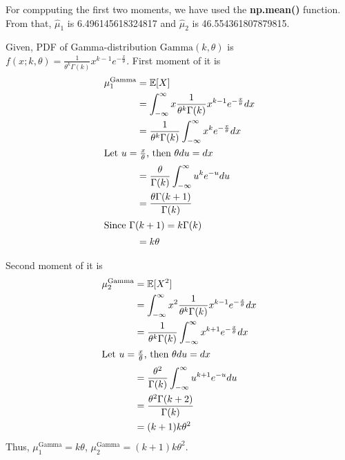 \begin{solution}
  	For compputing the first two moments, we have used the \textbf{np.mean()} function. From that, $\hat{\mu}_{1}$ is 6.496145618324817
   	and  $\hat{\mu}_{2}$ is 46.554361807879815.
    	
	Given, PDF of Gamma-distribution $\text{Gamma}(k, \theta)$ is $f(x;k,\theta) =
		\frac{1}{\theta^k\Gamma(k)}x^{k-1}e^{-\frac{x}{\theta}}$. First moment
	of it is
	\begin{align}
		\mu_1^\text{Gamma} & = \mathbb{E}[X]                               \\
		                   & = \int_{-\infty}^\infty
		x\frac{1}{\theta^k\Gamma(k)}x^{k-1}e^{-\frac{x}{\theta}}dx
		\\
		                   & =
		\frac{1}{\theta^k\Gamma(k)}\int_{-\infty}^\infty
		x^ke^{-\frac{x}{\theta}}dx                                 \\
		\intertext{Let $u = \frac{x}{\theta}$, then $\theta du = dx$}
		                   & =
		\frac{\theta}{\Gamma(k)}\int_{-\infty}^\infty
		u^k e^{-u} du                                              \\
		                   & = \frac{\theta\Gamma(k+1)}{\Gamma(k)}
		\\
		\intertext{Since $\Gamma(k+1)=k\Gamma(k)$}
		                   & = k\theta
	\end{align}

	Second moment of it is
	\begin{align}
		\mu_2^\text{Gamma} & = \mathbb{E}[X^2]                               \\
		                   & = \int_{-\infty}^\infty
		x^2\frac{1}{\theta^k\Gamma(k)}x^{k-1}e^{-\frac{x}{\theta}}dx
		\\
		                   & =
		\frac{1}{\theta^k\Gamma(k)}\int_{-\infty}^\infty
		x^{k+1}e^{-\frac{x}{\theta}}dx                               \\
		\intertext{Let $u = \frac{x}{\theta}$, then $\theta du = dx$}
		                   & =
		\frac{\theta^2}{\Gamma(k)}\int_{-\infty}^\infty
		u^{k+1}e^{-u} du                                             \\
		                   & = \frac{\theta^2\Gamma(k+2)}{\Gamma(k)}
		\\
		                   & = (k+1)k\theta^2
	\end{align}
	Thus, $\mu_1^\text{Gamma} = k\theta$, $\mu_2^\text{Gamma} = (k+1)k\theta^2$.


\end{solution}
